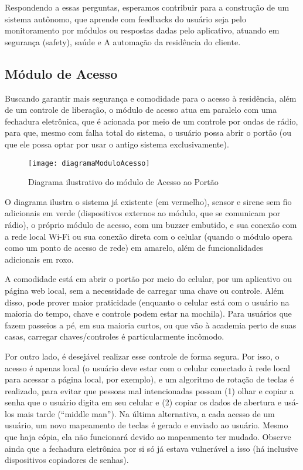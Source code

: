 Respondendo a essas perguntas, esperamos contribuir para a construção de um sistema autônomo, que aprende com feedbacks do usuário seja pelo monitoramento por módulos ou respostas dadas pelo aplicativo, atuando em segurança (safety), saúde e A
automação da residência do cliente.

\subsection{Módulo de Acesso}
Buscando garantir mais segurança e comodidade para o acesso à residência, além de um controle de liberação, o módulo de acesso atua em paralelo com uma fechadura eletrônica, que é acionada por meio de um controle por ondas de rádio, para que, mesmo com falha total do sistema, o usuário possa abrir o portão (ou que ele possa optar por usar o antigo sistema exclusivamente).

\begin{figure}[H]
	\centering
	\caption{Diagrama ilustrativo do módulo de Acesso ao Portão}
  \texttt{[image: diagramaModuloAcesso]}
\label{fig:diagramaModuloAcesso}
\end{figure}

O diagrama ilustra o sistema já existente (em vermelho), sensor e sirene sem fio adicionais em verde (dispositivos externos ao módulo, que se comunicam por rádio), o próprio módulo de acesso, com um buzzer embutido, e sua conexão com a rede local Wi-Fi ou sua conexão direta com o celular (quando o módulo opera como um ponto de acesso de rede) em amarelo, além de funcionalidades adicionais em roxo.

A comodidade está em abrir o portão por meio do celular, por um aplicativo ou página web local, sem a necessidade de carregar uma chave ou controle. Além disso, pode prover maior praticidade (enquanto o celular está com o usuário na maioria do tempo, chave e controle podem estar na mochila). Para usuários que fazem passeios a pé, em sua maioria curtos, ou que vão à academia perto de suas casas, carregar chaves/controles é particularmente incômodo.

Por outro lado, é desejável realizar esse controle de forma segura. Por isso, o acesso é apenas local (o usuário deve estar com o celular conectado à rede local para acessar a página local, por exemplo), e um algoritmo de rotação de teclas é realizado, para evitar que pessoas mal intencionadas possam (1) olhar e copiar a senha que o usuário digita em seu celular e (2) copiar os dados de abertura e usá-los mais tarde (“middle man”). Na última alternativa, a cada acesso de um usuário, um novo mapeamento de teclas é gerado e enviado ao usuário. Mesmo que haja cópia, ela não funcionará devido ao mapeamento ter mudado. Observe ainda que a fechadura eletrônica por si só já estava vulnerável a isso (há inclusive dispositivos copiadores de senhas).

